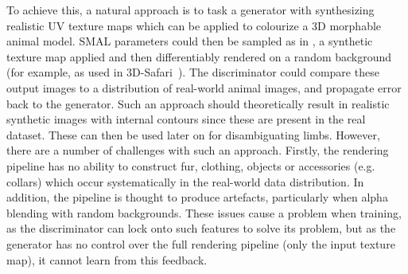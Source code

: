 To achieve this, a natural approach is to task a generator with synthesizing realistic UV texture maps which can be applied to colourize a 3D morphable animal model. SMAL parameters could then be sampled as in , a synthetic texture map applied and then differentiably rendered on a random background (for example, as used in 3D-Safari~). The discriminator could compare these output images to a distribution of real-world animal images, and propagate error back to the generator. Such an approach should theoretically result in realistic synthetic images with internal contours since these are present in the real dataset. These can then be used later on for disambiguating limbs. However, there are a number of challenges with such an approach. Firstly, the rendering pipeline has no ability to construct fur, clothing, objects or accessories (e.g. collars) which occur systematically in the real-world data distribution. In addition, the pipeline is thought to produce artefacts, particularly when alpha blending with random backgrounds. These issues cause a problem when training, as the discriminator can lock onto such features to solve its problem, but as the generator has no control over the full rendering pipeline (only the input texture map), it cannot learn from this feedback. 



